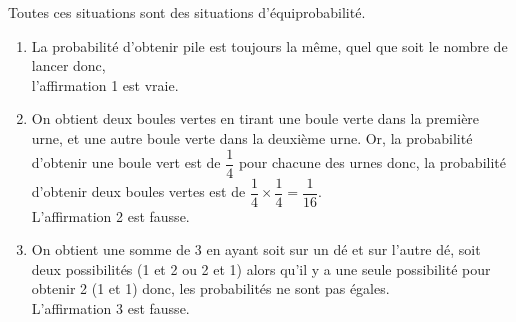    Toutes ces situations sont des situations d'équiprobabilité. \\
   \begin{enumerate}
      \item La probabilité d'obtenir pile est toujours la même, quel que soit le nombre de lancer donc, \\
         {\blue l'affirmation 1 est vraie}.
       \item On obtient deux boules vertes en tirant une boule verte dans la première urne, et une autre boule verte dans la deuxième urne. Or, la probabilité d'obtenir une boule vert est de $\dfrac14$ pour chacune des urnes donc, la probabilité d'obtenir deux boules vertes est de $\dfrac14\times\dfrac14 =\dfrac{1}{16}$. \\ [1mm]
         {\blue L'affirmation 2 est fausse}.
      \item On obtient une somme de 3 en ayant soit  \fg{} sur un dé et  \fg{} sur l'autre dé, soit deux possibilités (1 et 2 ou 2 et 1) alors qu'il y a une seule possibilité pour obtenir 2 (1 et 1) donc, les probabilités ne sont pas égales. \\
         {\blue L'affirmation 3 est fausse}.
   \end{enumerate}
